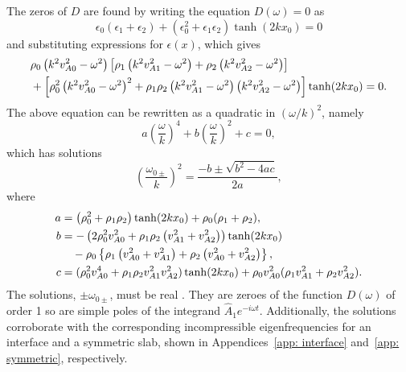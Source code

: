 The zeros of $D$ are found by writing the equation $D(\omega) = 0$ as
\begin{equation}
\epsilon_0(\epsilon_1 + \epsilon_2) + \left(\epsilon_0^2 + \epsilon_1\epsilon_2\right)\tanh(2kx_0) = 0
\end{equation}
and substituting expressions for $\epsilon(x)$, which gives
\begin{align}
&\rho_0\left(k^2v_{A0}^2 - \omega^2\right)\left[\rho_1\left(k^2v_{A1}^2 - \omega^2\right) + \rho_2\left(k^2v_{A2}^2 - \omega^2\right)\right] \notag \\
&+ \left[\rho_0^2\left(k^2v_{A0}^2 - \omega^2\right)^2 + \rho_1\rho_2\left(k^2v_{A1}^2 - \omega^2\right)\left(k^2v_{A2}^2 - \omega^2\right)\right]\tanh(2kx_0) = 0.
\end{align}
The above equation can be rewritten as a quadratic in $(\omega/k)^2$, namely
\begin{equation}
a \left(\frac{\omega}{k}\right)^4 + b \left(\frac{\omega}{k}\right)^2 + c = 0,
\end{equation}
which has solutions
\begin{equation}
\left(\frac{\omega_{0\pm}}{k}\right)^2 = \frac{-b \pm \sqrt{b^2 - 4ac}}{2a},
\label{quad sol}
\end{equation}
where
\begin{align}
a &= \left(\rho_0^2 + \rho_1\rho_2\right)\tanh(2kx_0) + \rho_0(\rho_1 + \rho_2), \label{solution a} \\
b &= -\left(2\rho_0^2v_{A0}^2 + \rho_1\rho_2\left(v_{A1}^2 + v_{A2}^2\right)\right)\tanh(2kx_0) \notag \\
& \quad - \rho_0 \left\{ \rho_1\left(v_{A0}^2 + v_{A1}^2\right) + \rho_2\left(v_{A0}^2 + v_{A2}^2\right) \right\}, \label{solution b} \\
c &= (\rho_0^2v_{A0}^4 + \rho_1\rho_2v_{A1}^2v_{A2}^2)\tanh(2kx_0) + \rho_0v_{A0}^2(\rho_1v_{A1}^2 + \rho_2v_{A2}^2). \label{solution c}
\end{align}
The solutions, $\pm\omega_{0\pm}$, must be real \citep{goe_etal04}. They are zeroes of the function $D(\omega)$ of order 1 so are simple poles of the integrand $\widehat{A}_1 e^{-i\omega t}$. Additionally, the solutions corroborate with the corresponding incompressible eigenfrequencies for an interface and a symmetric slab, shown in Appendices~\ref{app: interface} and~\ref{app: symmetric}, respectively.

